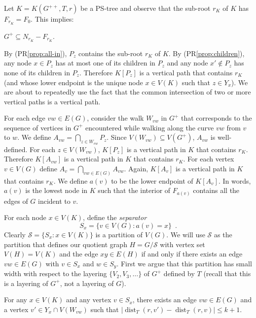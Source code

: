\documentclass{patmorin}
\DeclareMathOperator{\dist}{dist}
\renewcommand{\proplabel}[1]{\label{prop:#1}}
\renewcommand{\propref}[1]{(PR\ref{prop:#1})}
\begin{document}
Let $K=K(G^{++},T,r)$ be a PS-tree and observe that the sub-root $r_K$ of $K$ has $F_{r_K}=F_0$.  This implies:
\begin{compactenum}[(PR1)]\setcounter{enumi}{4}
  \item \proplabel{all-in}  $G^+\subseteq N_{r_K}-F_{r_K}$.
\end{compactenum}

By \propref{all-in}, $P_{z}$ contains the sub-root $r_K$ of $K$.  By \propref{children}, any node $x\in P_z$ has at most one of its children in $P_z$ and any node $x'\not\in P_z$ has none of its children in $P_z$.  Therefore $K[P_z]$ is a vertical path that contains $r_K$ (and whose lower endpoint is the unique node $x\in V(K)$ such that $z\in Y_x$). We are about to repeatedly use the fact that the common intersection of two or more vertical paths is a vertical path. 

For each edge $vw\in E(G)$, consider the walk $W_{vw}$ in $G^+$ that corresponds to the sequence of vertices in $G^+$ encountered while walking along the curve $vw$ from $v$ to $w$. We define $A_{vw}=\bigcap_{z\in W_{vw}} P_z$.  Since $V(W_{vw})\subseteq V(G^+)$, $A_{vw}$ is well-defined.  For each $z\in V(W_{vw})$, $K[P_{z}]$ is a vertical path in $K$ that contains $r_K$.   Therefore $K[A_{vw}]$ is a vertical path in $K$ that contains $r_K$.  For each vertex $v\in V(G)$ define $A_v=\bigcap_{vw\in E(G)} A_{vw}$.  Again, $K[A_v]$ is a vertical path in $K$ that contains $r_K$.  We define $a(v)$ to be the lower endpoint of $K[A_v]$.  In words, $a(v)$ is the lowest node in $K$ such that the interior of $F_{a(v)}$ contains all the edges of $G$ incident to $v$.

For each node $x\in V(K)$, define the \emph{separator}
\[
   S_x = \{v\in V(G): a(v)=x \} \enspace .
\]
Clearly $\mathcal{S}=\{S_x:x\in V(K)\}$ is a partition of $V(G)$.  We will use $\mathcal{S}$ as the partition that defines our quotient graph $H=G/\mathcal{S}$ with vertex set $V(H)=V(K)$ and the edge $xy\in E(H)$ if and only if there exists an edge $vw\in E(G)$ with $v\in S_x$ and $w\in S_y$.  First we argue that this partition has small width with respect to the layering $\{V_2,V_3,\ldots\}$ of $G^+$ defined by $T$ (recall that this is a layering of $G^+$, not a layering of $G$).

\begin{clm}
   For any $x\in V(K)$ and any vertex $v\in S_x$, there exists an edge $vw\in E(G)$ and a vertex $v'\in Y_x\cap V(W_{vw})$ such that $|\dist_T(r,v')-\dist_T(r,v)|\le k+1$.
\end{clm}
\end{document}
